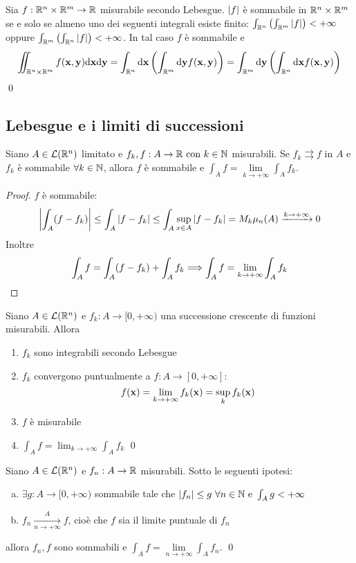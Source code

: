 \begin{theorem}
	[di Fubini]
	Sia $f:\mathbb{R}^n\times\mathbb{R}^m\to\mathbb{R}$ misurabile secondo Lebesgue. $\abs{f}$ è sommabile in $\mathbb{R}^n\times\mathbb{R}^m$ se e solo se almeno uno dei seguenti integrali esiste finito: $\int_{\mathbb{R}^n}\left(\int_{\mathbb{R}^m}\abs{f}\right)<+\infty$ oppure $\int_{\mathbb{R}^m}\left(\int_{\mathbb{R}^n}\abs{f}\right)<+\infty$. In tal caso $f$ è sommabile e 
	$$
		\iint_{\mathbb{R}^n\times\mathbb{R}^m}f(\vb{x},\vb{y})\dd \vb{x} \dd \vb{y} = \int_{\mathbb{R}^n}\dd \vb{x}\left(\int_{\mathbb{R}^m} \dd \vb{y} f(\vb{x},\vb{y})\right)=\int_{\mathbb{R}^m}\dd \vb{y} \left(\int_{\mathbb{R}^n}\dd \vb{x} f(\vb{x},\vb{y})\right)
	$$
	\qed
\end{theorem}

\subsection{Lebesgue e i limiti di successioni}

\begin{theorem}
	Siano $A\in \mathcal{L}(\mathbb{R}^n)$ limitato e $f_k,f:A\to\mathbb{R} \text{ con } k \in \mathbb{N}$ misurabili. Se $f_k \rightrightarrows f$ in $A$ e $f_k$ è sommabile $\forall k \in \mathbb{N}$, allora $f$ è sommabile e $\int_A f = \lim\limits_{k\to+\infty}\int_Af_k$.
\end{theorem}

\begin{proof}
	$f$ è sommabile:
	$$\displaystyle\abs{\int_A (f-f_k)}\leq \int_A\abs{f-f_k}\leq \int_A\sup_{x \in A}\abs{f-f_k}=M_k\mu_n(A)\xrightarrow{k\to+\infty}0$$
	Inoltre
	$$
		\int_Af=\int_A(f-f_k)+\int_Af_k\Longrightarrow \int_Af=\lim_{k\to+\infty}\int_Af_k
	$$
\end{proof}

\begin{theorem}
	Siano $A \in \mathcal{L}(\mathbb{R}^n)$ e $f_k:A\to[0,+\infty)$ una successione crescente di funzioni misurabili. Allora
	\begin{enumerate}
		\item $f_k$ sono integrabili secondo Lebesgue
		\item $f_k$ convergono puntualmente a $f: A\to[0,+\infty]$: $$f(\vb{x})=\lim\limits_{k\to+\infty}f_k(\vb{x})=\sup_kf_k(\vb{x})$$
		\item $f$ è misurabile
		\item $\displaystyle\int_Af=\lim_{k\to+\infty}\int_Af_k$
		\qed
	\end{enumerate}
\end{theorem}

\begin{theorem}
	Siano $A\in \mathcal{L}(\mathbb{R}^n)$ e $f_n:A\to\mathbb{R}$ misurabili. Sotto le seguenti ipotesi:
	\begin{enumerate}[a.]
		\item $\exists g:A\to[0,+\infty)$ sommabile tale che $\abs{f_n}\leq g\ \forall n \in \mathbb{N} \text{ e } \int_Ag<+\infty$
		\item $f_n\xrightarrow[n\to+\infty]{A}f$, cioè che $f$ sia il limite puntuale di $f_n$
	\end{enumerate}
	allora $f_n,f$ sono sommabili e $\int_Af=\lim\limits_{n\to+\infty}\int_Af_n$.
	\qed
\end{theorem}
